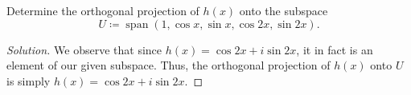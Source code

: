 \documentclass{article}
\newenvironment{solution}{\begin{proof}[Solution]}{\end{proof}}
\DeclareMathOperator*{\vspan}{\mathrm{span}}
\newcommand{\innerproduct}[2]{\left\langle{#1}, {#2}\right\rangle}
\begin{document}
	\begin{hw}
		Determine the orthogonal projection of $h(x)$ onto the subspace
		\begin{equation*}
			U \coloneq \vspan(1, \cos x, \sin x, \cos 2x, \sin 2x).
		\end{equation*} 
	\end{hw}
	\begin{solution}
		\begin{comment}
			First, we can orthonormalise the basis to get:
		\begin{equation*}
			e_{1}, e_{2}, e_{3}, e_{4}, e_{5} = \frac{1}{\sqrt{2\pi}}, \frac{\cos x}{\sqrt{\pi}}, \frac{\sin x}{\sqrt{\pi}}, \frac{\cos 2x}{\sqrt{\pi}}, \frac{\sin 2x}{\sqrt{\pi}}.
		\end{equation*}
		
		From here, we observe that to find the orthogonal projection of $h(x)$ onto $U$, we consider the following:
		\begin{equation*}
			\innerproduct{h(x)}{e_{1}}e_{1} + \innerproduct{h(x)}{e_{2}}e_{2} + \ldots + \innerproduct{h(x)}{e_{5}}e_{5}.
		\end{equation*}
		
		However, using the property of inner product along with orthogonality of each of the $1, \cos x, \ldots, \sin 2x$, we can rewrite the above expression to the following:
		\begin{equation*}
			\innerproduct{\cos(2x)}{\frac{\cos(2x)}{\sqrt{\pi}}}\frac{\cos(2x)}{\sqrt{\pi}} + \innerproduct{i\sin(2x)}{\frac{\sin(2x)}{\sqrt{\pi}}}\frac{\sin(2x)}{\sqrt{\pi}}.
		\end{equation*}
		
		From here, we note that this becomes:
		\begin{align*}
			\frac{\cos(2x)}{\pi}\innerproduct{\cos(2x)}{\cos(2x)} + \frac{i\sin(2x)}{\pi}\innerproduct{\sin(2x)}{\sin(2x)} &= \frac{\cos(2x)}{\pi}\int_{-\pi}^{\pi} \cos(2x)^{2}\mathrm dx + \frac{i\sin(2x)}{\pi} \int_{-\pi}^{\pi} \sin(2x) \mathrm dx \\
			&= \frac{\pi\cos(2x)}{\pi} + i \frac{\pi\sin(2x)}{\pi} \\
			&= \cos(2x) + i\sin(2x) \\
			&= e^{2ix} \\
			&= h(x)
		\end{align*}
		\end{comment}
		We observe that since $h(x) = \cos 2x + i\sin 2x$, it in fact is an element of our given subspace. Thus, the orthogonal projection of $h(x)$ onto $U$ is simply $h(x) = \cos 2x + i\sin 2x$.
	\end{solution}
	
\end{document}
